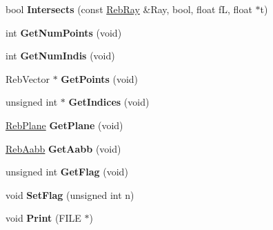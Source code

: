 \begin{DoxyCompactItemize}
\item 
bool {\bfseries Intersects} (const \hyperlink{class_reb_ray}{Reb\+Ray} \&Ray, bool, float fL, float $\ast$t)\hypertarget{class_reb_polygon_a6d58c9fda3335c3b8b81de649326b59b}{}\label{class_reb_polygon_a6d58c9fda3335c3b8b81de649326b59b}

\item 
int {\bfseries Get\+Num\+Points} (void)\hypertarget{class_reb_polygon_adbac65ecc89f6272528f61ed26a13c09}{}\label{class_reb_polygon_adbac65ecc89f6272528f61ed26a13c09}

\item 
int {\bfseries Get\+Num\+Indis} (void)\hypertarget{class_reb_polygon_a969f72a952e2261148f6e58544a94e7a}{}\label{class_reb_polygon_a969f72a952e2261148f6e58544a94e7a}

\item 
Reb\+Vector $\ast$ {\bfseries Get\+Points} (void)\hypertarget{class_reb_polygon_a15d88176a2fa725d286eba5efaf5bf2c}{}\label{class_reb_polygon_a15d88176a2fa725d286eba5efaf5bf2c}

\item 
unsigned int $\ast$ {\bfseries Get\+Indices} (void)\hypertarget{class_reb_polygon_a6b90da1a07dd430ac16d666115e0c4f3}{}\label{class_reb_polygon_a6b90da1a07dd430ac16d666115e0c4f3}

\item 
\hyperlink{class_reb_plane}{Reb\+Plane} {\bfseries Get\+Plane} (void)\hypertarget{class_reb_polygon_a44118f7504be2c01c9b2518f65fea9e0}{}\label{class_reb_polygon_a44118f7504be2c01c9b2518f65fea9e0}

\item 
\hyperlink{class_reb_aabb}{Reb\+Aabb} {\bfseries Get\+Aabb} (void)\hypertarget{class_reb_polygon_a551ea3743484fef483129246702978e3}{}\label{class_reb_polygon_a551ea3743484fef483129246702978e3}

\item 
unsigned int {\bfseries Get\+Flag} (void)\hypertarget{class_reb_polygon_a1f8f71f999a8e614dd3acb81cb4f98b3}{}\label{class_reb_polygon_a1f8f71f999a8e614dd3acb81cb4f98b3}

\item 
void {\bfseries Set\+Flag} (unsigned int n)\hypertarget{class_reb_polygon_a084ccf879af75eaf48c940de8a462505}{}\label{class_reb_polygon_a084ccf879af75eaf48c940de8a462505}

\item 
void {\bfseries Print} (F\+I\+LE $\ast$)\hypertarget{class_reb_polygon_a8887f3879bf3a51ae0cc64e054d60409}{}\label{class_reb_polygon_a8887f3879bf3a51ae0cc64e054d60409}

\end{DoxyCompactItemize}
